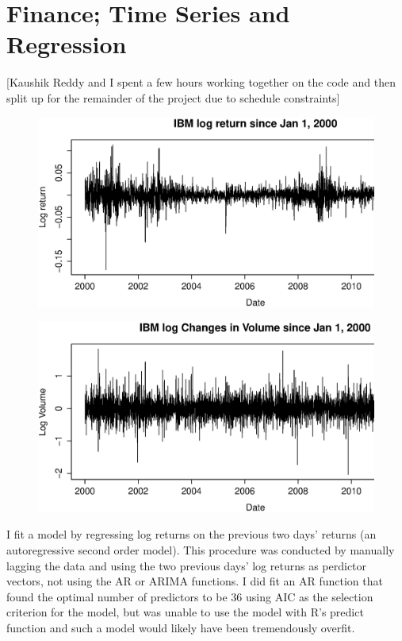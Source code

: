 \documentclass{article}
\begin{document}
\section{Finance; Time Series and Regression}
[Kaushik Reddy and I spent a few hours working together on the code and then split up for the remainder of the project due to schedule constraints]

\begin{figure}[H]
\begin{center}
\includegraphics[width=1\columnwidth]{IBM_log_return.eps}
\caption{}
\end{center}
\end{figure}


\begin{figure}[H]
\begin{center}
\includegraphics[width=1\columnwidth]{IBM_log_volume.eps}
\caption{}
\end{center}
\end{figure}


I fit a model by regressing log returns on the previous two days' returns (an autoregressive second order model).  This procedure was conducted by manually lagging the data and using the two previous days' log returns as perdictor vectors, not using the AR or ARIMA functions. I did fit an AR function that found the optimal number of predictors to be 36 using AIC as the selection criterion for the model, but was unable to use the model with R's predict function and such a model would likely have been tremendously overfit. 
\end{document}
